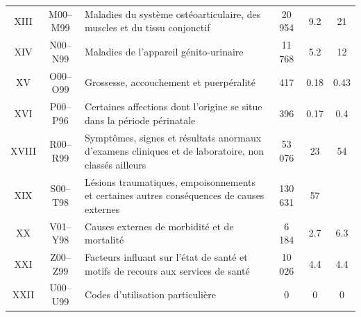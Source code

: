 \documentclass[12pt,english,french,twoside]{book}\usepackage[]{graphicx}\usepackage[]{color}
\begin{document}
\begin{longtable}{|c|c|m{4cm}|c|c|c|}
XIII&M00–M99&Maladies du système ostéoarticulaire, des muscles et du tissu conjonctif&20 954&9.2&21\\

XIV&N00–N99&Maladies de l'appareil génito-urinaire&11 768&5.2&12\\

XV&O00–O99&Grossesse, accouchement et puerpéralité&417&0.18&0.43\\

XVI&P00–P96&Certaines affections dont l'origine se situe dans la période périnatale&396&0.17&0.4\\


XVIII&R00–R99&Symptômes, signes et résultats anormaux d'examens cliniques et de laboratoire, non classés ailleurs&53 076&23&54\\

XIX&S00–T98&Lésions traumatiques, empoisonnements et certaines autres conséquences de causes externes&130 631&57& \\

XX&V01–Y98&Causes externes de morbidité et de mortalité& 6 184&2.7&6.3\\

XXI&Z00–Z99&Facteurs influant sur l'état de santé et motifs de recours aux services de santé&10 026&4.4&4.4\\

XXII&U00–U99&Codes d'utilisation particulière & 0&0&0\\

  \hline
\end{longtable}
\end{document}

